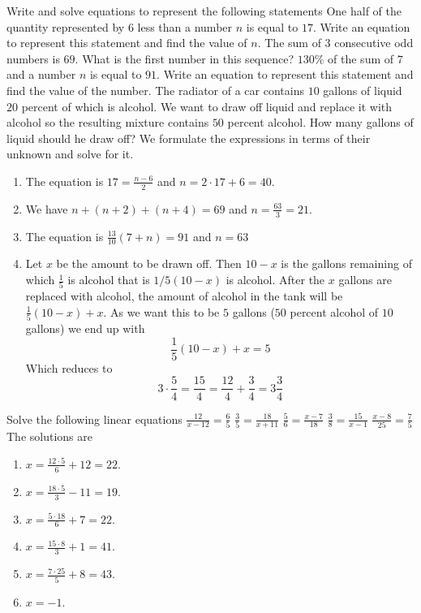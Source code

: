 \begin{ExerciseList}
\Exercise Write and solve equations to represent the following statements
\Question One half of the quantity represented by $6$ less than a number $n$ is equal to $17$. Write an equation to represent this statement and find the value of $n$.
\Question The sum of $3$ consecutive odd numbers is $69$. What is the first number in this sequence?
\Question $130\%$ of the sum of $7$ and a number $n$ is equal to $91$. Write an equation to represent this statement and find the value of the number.
\Question The radiator of a car contains $10$ gallons of liquid $20$ percent of which is alcohol. We want to draw off liquid and replace it with alcohol so the resulting mixture contains $50$ percent alcohol. How many gallons of liquid should he draw off?
\Answer We formulate the expressions in terms of their unknown and solve for it.
\begin{enumerate}
\item \myindent The equation is $17=\frac{n-6}{2}$ and $n = 2 \cdot 17 + 6 = 40$.
\item \myindent We have $n + (n+2) + (n+4) = 69$ and $n = \frac{63}{3} = 21$.
\item \myindent The equation is $\frac{13}{10}(7 + n) = 91$ and $n = 63$
\item \myindent Let $x$ be the amount to be drawn off. Then $10 - x$ is the gallons remaining of which $\frac{1}{5}$ is alcohol that is $1/5(10 - x)$ is alcohol. After the $x$ gallons are replaced with alcohol, the amount of alcohol in the tank will be $\frac{1}{5}(10 - x) + x$. As we want this to be $5$ gallons ($50$ percent alcohol of $10$ gallons) we end up with
\[
\frac{1}{5}(10 - x) + x = 5
\]
Which reduces to
\[
3 \cdot \frac{5}{4} = \frac{15}{4} = \frac{12}{4} + \frac{3}{4} = 3\frac{3}{4}
\]
\end{enumerate}

\Exercise Solve the following linear equations
\Question $\frac{12}{x-12} = \frac{6}{5}$
\Question $\frac{3}{5} = \frac{18}{x + 11}$
\Question $\frac{5}{6} = \frac{x-7}{18}$
\Question $\frac{3}{8} = \frac{15}{x-1}$
\Question $\frac{x-8}{25} = \frac{7}{5}$
\Answer The solutions are
\begin{enumerate}
\item\myindent $x = \frac{12 \cdot 5}{6} + 12 = 22$.
\item\myindent $x = \frac{18 \cdot 5}{3} - 11 = 19$.
\item\myindent $x = \frac{5 \cdot 18}{6} + 7 = 22$.
\item\myindent $x = \frac{15 \cdot 8}{3} + 1 = 41$.
\item\myindent $x = \frac{7 \cdot 25}{5} + 8 = 43$.
\item\myindent $x = -1$.
\end{enumerate}


\end{ExerciseList}
